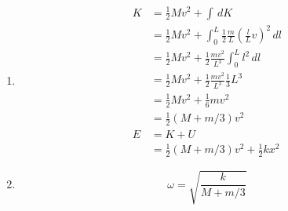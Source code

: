 \documentclass{article}
\begin{document}
\begin{enumerate}
  \item

        \begin{align*}
          K & = \frac{1}{2} M v^2 + \int \,dK                                                            \\
            & = \frac{1}{2} M v^2 + \int_0^L \frac{1}{2} \frac{m}{L} \left( \frac{l}{L} v \right)^2 \,dl \\
            & = \frac{1}{2} M v^2 + \frac{1}{2} \frac{m v^2}{L^3} \int_0^L l^2 \,dl                      \\
            & = \frac{1}{2} M v^2 + \frac{1}{2} \frac{m v^2}{L^3} \frac{1}{3} L^3                        \\
            & = \frac{1}{2} M v^2 + \frac{1}{6} m v^2                                                    \\
            & = \frac{1}{2} (M + m / 3) v^2                                                              \\
          E & = K + U                                                                                    \\
            & = \frac{1}{2} (M + m / 3) v^2 + \frac{1}{2} k x^2
        \end{align*}

  \item

        \[\omega = \sqrt{\frac{k}{M + m / 3}}\]
\end{enumerate}

\subsection{}
\end{document}
